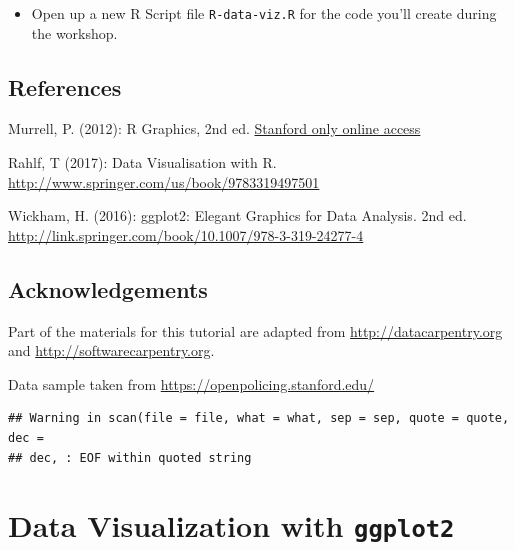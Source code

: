 \documentclass[]{book}
\providecommand{\tightlist}{%
  \setlength{\itemsep}{0pt}\setlength{\parskip}{0pt}}
\theoremstyle{definition}
\theoremstyle{definition}
\theoremstyle{definition}
\theoremstyle{remark}
\begin{document}
\begin{itemize}
\tightlist
\item
  Open up a new R Script file \texttt{R-data-viz.R} for the code you'll
  create during the workshop.
\end{itemize}

\section*{References}\label{references}

Murrell, P. (2012): R Graphics, 2nd ed.
\href{https://stanford.idm.oclc.org/login?url=http://proquest.safaribooksonline.com/?uiCode=stanford\&xmlId=9781439831779}{Stanford
only online access}

Rahlf, T (2017): Data Visualisation with R.
\url{http://www.springer.com/us/book/9783319497501}

Wickham, H. (2016): ggplot2: Elegant Graphics for Data Analysis. 2nd ed.
\url{http://link.springer.com/book/10.1007/978-3-319-24277-4}

\section*{Acknowledgements}\label{acknowledgements}

Part of the materials for this tutorial are adapted from
\url{http://datacarpentry.org} and \url{http://softwarecarpentry.org}.

Data sample taken from \url{https://openpolicing.stanford.edu/}

\begin{verbatim}
## Warning in scan(file = file, what = what, sep = sep, quote = quote, dec =
## dec, : EOF within quoted string
\end{verbatim}

\chapter{\texorpdfstring{Data Visualization with
\texttt{ggplot2}}{Data Visualization with ggplot2}}\label{data-visualization-with-ggplot2}
\end{document}
